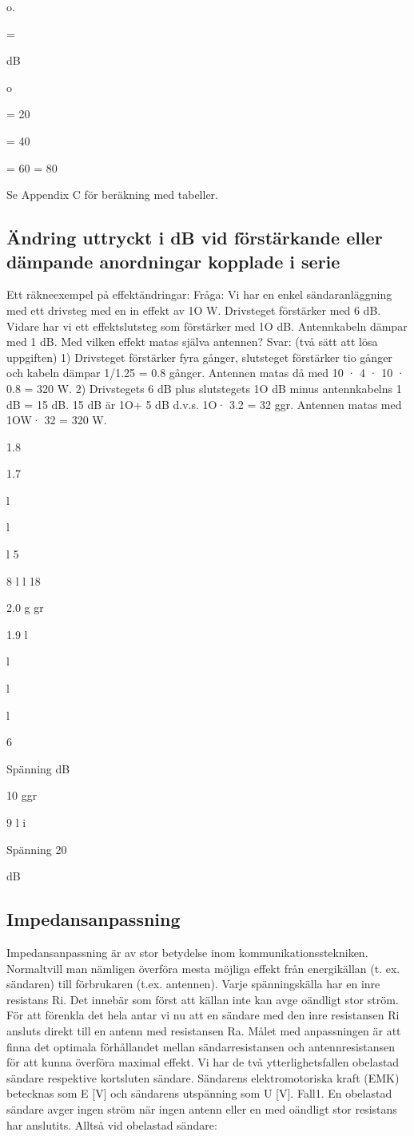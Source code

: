 o.

=

dB

o

= 20

= 40

= 60
= 80

Se Appendix C för beräkning med tabeller.

\subsection{Ändring uttryckt i dB vid förstärkande eller
dämpande anordningar kopplade i serie}

Ett räkneexempel på effektändringar:
Fråga:
Vi har en enkel sändaranläggning med
ett drivsteg med en in effekt av 1O W. Drivsteget förstärker med 6 dB. Vidare har vi ett
effektslutsteg som förstärker med 1O dB.
Antennkabeln dämpar med 1 dB.
Med vilken effekt matas själva antennen?
Svar: (två sätt att lösa uppgiften)
1) Drivsteget förstärker fyra gånger, slutsteget förstärker tio gånger och kabeln
dämpar 1/1.25 = 0.8 gånger. Antennen
matas då med 10 · 4 · 10 · 0.8 = 320 W.
2) Drivstegets 6 dB plus slutstegets 1O dB
minus antennkabelns 1 dB = 15 dB.
15 dB är 1O+ 5 dB d.v.s. 1O· 3.2 = 32 ggr.
Antennen matas med 1OW· 32 = 320 W.

1.8

1.7

l

l

l
5

8
l
l
18

2.0 g gr

1.9
l

l

l

l

6

Spänning
dB

10 ggr

9
l
i

Spänning
20

dB

\subsection{Impedansanpassning}
Impedansanpassning är av stor betydelse
inom kommunikationsstekniken. Normaltvill
man nämligen överföra mesta möjliga effekt
från energikällan (t. ex. sändaren) till förbrukaren (t.ex. antennen).
Varje spänningskälla har en inre resistans Ri. Det innebär som först att källan inte
kan avge oändligt stor ström. För att förenkla
det hela antar vi nu att en sändare med den
inre resistansen Ri ansluts direkt till en antenn med resistansen Ra.
Målet med anpassningen är att finna det
optimala förhållandet mellan sändarresistansen och antennresistansen för att kunna
överföra maximal effekt. Vi har de två ytterlighetsfallen obelastad sändare respektive
kortsluten sändare. Sändarens elektromotoriska kraft (EMK) betecknas som E [V]
och sändarens utspänning som U [V].
Fall1.
En obelastad sändare avger ingen ström när
ingen antenn eller en med oändligt stor resistans har anslutits.
Alltså vid obelastad sändare:

